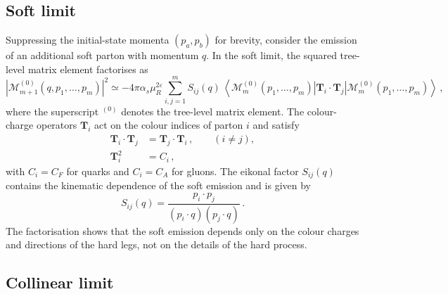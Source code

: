 \subsection{Soft limit}
\label{subsec:soft-fact}

Suppressing the initial-state momenta $(p_a,p_b)$ for brevity, consider
the emission of an additional soft parton with momentum $q$. In the
soft limit, the squared tree-level matrix element factorises as
\begin{equation}
\label{eq:soft-fact}
    |\mathcal{M}_{m+1}^{(0)}(q,p_1,\ldots,p_m)|^2
    \simeq
    -4\pi\alpha_s\mu_R^{2\varepsilon}
    \sum_{i,j=1}^{m}
        S_{ij}(q)\,
        \left\langle
            \mathcal{M}_m^{(0)}(p_1,\ldots,p_m)
        \left|
            \mathbf{T}_i \cdot \mathbf{T}_j
        \right|
            \mathcal{M}_m^{(0)}(p_1,\ldots,p_m)
        \right\rangle\,,
\end{equation}
where the superscript $^{(0)}$ denotes the tree-level matrix element.
The colour-charge operators $\mathbf{T}_i$ act on the colour indices
of parton $i$ and satisfy
\begin{equation}
\label{eq:colour-charge-op}
\begin{aligned}
    \mathbf{T}_i \cdot \mathbf{T}_j &= \mathbf{T}_j \cdot \mathbf{T}_i\,,
    \qquad (i\neq j),\\[4pt]
    \mathbf{T}_i^2 &= C_i\,,
\end{aligned}
\end{equation}
with $C_i = C_F$ for quarks and $C_i = C_A$ for gluons. 
The eikonal factor $S_{ij}(q)$ contains the kinematic dependence of
the soft emission and is given by
\begin{equation}
\label{eq:eikonal-fac}
    S_{ij}(q) = \frac{p_i \cdot p_j}{(p_i \cdot q)(p_j \cdot q)} \,.
\end{equation}
The factorisation shows that the soft emission depends only on the
colour charges and directions of the hard legs, not on the details
of the hard process. 

\subsection{Collinear limit}
\label{subsec:collinear-fact}

